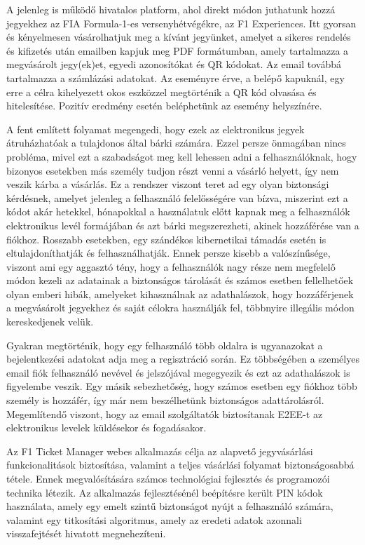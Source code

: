 A jelenleg is működő hivatalos platform, ahol direkt módon juthatunk hozzá jegyekhez az FIA Formula-1-es versenyhétvégékre, az F1 Experiences. Itt gyorsan és kényelmesen vásárolhatjuk meg a kívánt jegyünket, amelyet a sikeres rendelés és kifizetés után emailben kapjuk meg PDF formátumban, amely tartalmazza a megvásárolt jegy(ek)et, egyedi azonosítókat és QR kódokat. Az email továbbá tartalmazza a számlázási adatokat. Az eseményre érve, a belépő kapuknál, egy erre a célra kihelyezett okos eszközzel megtörténik a QR kód olvasása és hitelesítése. Pozitív eredmény esetén beléphetünk az esemény helyszínére.

A fent említett folyamat megengedi, hogy ezek az elektronikus jegyek átruházhatóak a tulajdonos által bárki számára. Ezzel persze önmagában nincs probléma, mivel ezt a szabadságot meg kell lehessen adni a felhasználóknak, hogy bizonyos esetekben más személy tudjon részt venni a vásárló helyett, így nem veszik kárba a vásárlás. Ez a rendszer viszont teret ad egy olyan biztonsági kérdésnek, amelyet jelenleg a felhasználó felelősségére van bízva, miszerint ezt a kódot akár hetekkel, hónapokkal a használatuk előtt kapnak meg a felhasználók elektronikus levél formájában és azt bárki megszerezheti, akinek hozzáférése van a fiókhoz. Rosszabb esetekben, egy szándékos kibernetikai támadás esetén is eltulajdoníthatják és felhasználhatják. Ennek persze kisebb a valószínűsége, viszont ami egy aggasztó tény, hogy a felhasználók nagy része nem megfelelő módon kezeli az adatainak a biztonságos tárolását és számos esetben fellelhetőek olyan emberi hibák, amelyeket kihasználnak az adathalászok, hogy hozzáférjenek a megvásárolt jegyekhez és saját célokra használják fel, többnyire illegális módon kereskedjenek velük.

\pagebreak
Gyakran megtörténik, hogy egy felhasználó több oldalra is ugyanazokat a bejelentkezési adatokat adja meg a regisztráció során. Ez többségében a személyes email fiók felhasználó nevével és jelszójával megegyezik és ezt az adathalászok is figyelembe veszik. Egy másik sebezhetőség, hogy számos esetben egy fiókhoz több személy is hozzáfér, így már nem beszélhetünk biztonságos adattárolásról. Megemlítendő viszont, hogy az email szolgáltatók biztosítanak E2EE-t az elektronikus levelek küldésekor és fogadásakor.

Az F1 Ticket Manager webes alkalmazás célja az alapvető jegyvásárlási funkcionalitások biztosítása, valamint a teljes vásárlási folyamat biztonságosabbá tétele. Ennek megvalósítására számos technológiai fejlesztés és programozói technika létezik. Az alkalmazás fejlesztésénél beépítésre került PIN kódok használata, amely egy emelt szintű biztonságot nyújt a felhasználó számára, valamint egy titkosítási algoritmus, amely az eredeti adatok azonnali visszafejtését hivatott megnehezíteni. 